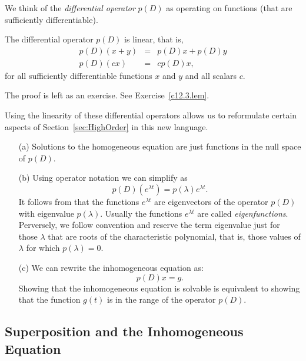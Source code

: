 We think of the {\em differential 
operator\/} $p(D)$ as operating on 
functions (that are sufficiently differentiable). 
\begin{lemma}  \label{L:p(D)linear}
The differential operator $p(D)$ is linear, that is,
\begin{eqnarray*}
p(D)(x+y) & = & p(D)x + p(D)y \\
p(D)(cx) & = & cp(D)x,
\end{eqnarray*}
for all sufficiently differentiable functions $x$ and $y$ and all scalars $c$.
\end{lemma}
The proof is left as an exercise.  See Exercise~\ref{c12.3.lem}.

Using the linearity of these differential operators allows us to reformulate
certain aspects of Section~\ref{sec:HighOrder} in this new language.

\begin{enumerate}
\item[(a)]  Solutions to the homogeneous equation  are just 
functions in the null space 
of $p(D)$.  
\item[(b)]  Using operator notation we can simplify  as
\begin{equation}  \label{e:elam2}
p(D)\left(e^{\lambda t}\right) = p(\lambda)e^{\lambda t}.
\end{equation}
It follows from  that the functions $e^{\lambda t}$ are 
eigenvectors 
of the operator $p(D)$ with eigenvalue $p(\lambda)$.  
Usually the functions $e^{\lambda t}$ are called 
{\em eigenfunctions}.
Perversely, we follow convention and reserve the term eigenvalue just 
for those $\lambda$ that are roots of the characteristic polynomial, that 
is, those values of $\lambda$ for which $p(\lambda)=0$.
\item[(c)]  We can rewrite the 
inhomogeneous equation as:
\[
p(D)x = g.
\]
Showing that the inhomogeneous equation is solvable is
equivalent to showing that the 
function $g(t)$ is in the range 
of the operator $p(D)$.
\end{enumerate}

\subsection*{Superposition and the Inhomogeneous Equation}

